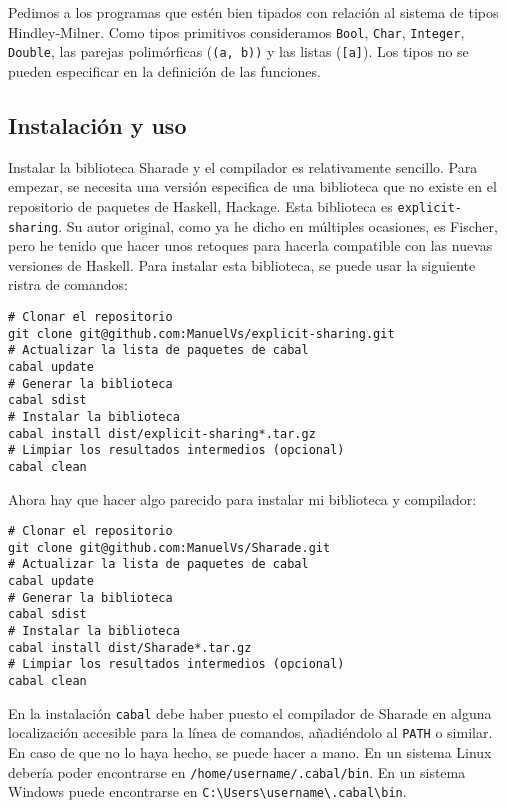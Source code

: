 \documentclass[class=article, crop=false]{standalone}
\begin{document}
Pedimos a los programas que estén bien tipados con relación al sistema de tipos
Hindley-Milner. Como tipos primitivos consideramos \verb`Bool`, \verb`Char`, \verb`Integer`,
\verb`Double`, las parejas polimórficas (\verb`(a, b))` y las listas (\verb`[a]`). Los tipos
no se pueden especificar en la definición de las funciones.

\subsection{Instalación y uso}

Instalar la biblioteca Sharade y el compilador es relativamente sencillo. Para empezar, se
necesita una versión especifica de una biblioteca que no existe en el repositorio de paquetes
de Haskell, Hackage. Esta biblioteca es \verb`explicit-sharing`. Su autor original, como ya
he dicho en múltiples ocasiones, es Fischer, pero he tenido que hacer unos retoques para
hacerla compatible con las nuevas versiones de Haskell. Para instalar esta biblioteca, se
puede usar la siguiente ristra de comandos:

\begin{verbatim}
# Clonar el repositorio
git clone git@github.com:ManuelVs/explicit-sharing.git
# Actualizar la lista de paquetes de cabal
cabal update
# Generar la biblioteca
cabal sdist
# Instalar la biblioteca
cabal install dist/explicit-sharing*.tar.gz
# Limpiar los resultados intermedios (opcional)
cabal clean
\end{verbatim}

Ahora hay que hacer algo parecido para instalar mi biblioteca y compilador:

\begin{verbatim}
# Clonar el repositorio
git clone git@github.com:ManuelVs/Sharade.git
# Actualizar la lista de paquetes de cabal
cabal update
# Generar la biblioteca
cabal sdist
# Instalar la biblioteca
cabal install dist/Sharade*.tar.gz
# Limpiar los resultados intermedios (opcional)
cabal clean
\end{verbatim}

En la instalación \verb`cabal` debe haber puesto el compilador de Sharade en alguna
localización accesible para la línea de comandos, añadiéndolo al \verb`PATH` o similar. En
caso de que no lo haya hecho, se puede hacer a mano. En un sistema Linux debería poder
encontrarse en \verb`/home/username/.cabal/bin`. En un sistema Windows puede encontrarse en
\verb`C:\Users\username\.cabal\bin`.
\end{document}
